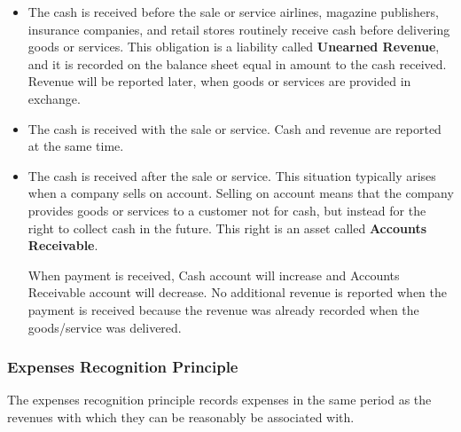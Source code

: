 \documentclass[../main.tex]{subfiles}
\begin{document}
	\begin{itemize}[noitemsep]
		\item The cash is received before the sale or service \eg airlines, 
		magazine publishers, insurance companies, and retail stores routinely 
		receive cash before delivering goods or services. This obligation is a 
		liability called \textbf{Unearned Revenue}, and it is recorded on the 
		balance sheet equal in amount to the cash received. Revenue 
		will be reported later, when goods or services are provided in 
		exchange.
		\item The cash is received with the sale or service. Cash and revenue 
		are reported at the same time.
		\item The cash is received after the sale or service. This situation 
		typically arises when a company sells on account. Selling on account 
		means that the company provides goods or services to a customer not for 
		cash, but instead for the right to collect cash in the future. This 
		right is an asset called \textbf{Accounts Receivable}. 
		
		When payment is received, Cash account will increase
		and Accounts Receivable account will decrease. No additional revenue is 
		reported when the payment is received because the revenue was already 
		recorded when the goods/service was delivered. 
	\end{itemize}

	\subsubsection{Expenses Recognition Principle}
	
	The expenses recognition principle records expenses in the same period as 
	the revenues with which they can be reasonably be associated with. 
	
\end{document}
